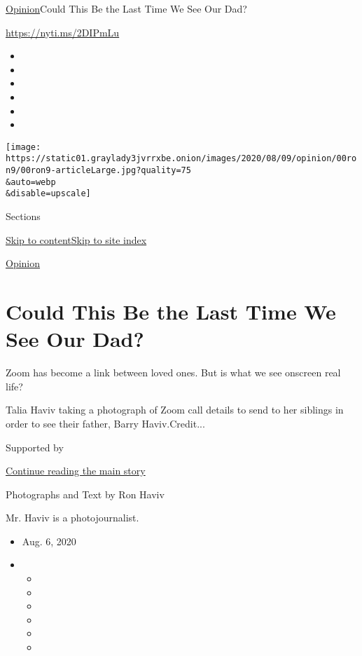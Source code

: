 \href{/section/opinion}{Opinion}\textbar{}Could This Be the Last Time We
See Our Dad?

\url{https://nyti.ms/2DIPmLu}

\begin{itemize}
\item
\item
\item
\item
\item
\item
\end{itemize}

\texttt{[image: https://static01.graylady3jvrrxbe.onion/images/2020/08/09/opinion/00ron9/00ron9-articleLarge.jpg?quality=75\\\&auto=webp\\\&disable=upscale]}

Sections

\protect\hyperlink{site-content}{Skip to
content}\protect\hyperlink{site-index}{Skip to site index}

\href{/section/opinion}{Opinion}

\hypertarget{could-this-be-the-last-time-we-see-our-dad}{%
\section{Could This Be the Last Time We See Our
Dad?}\label{could-this-be-the-last-time-we-see-our-dad}}

Zoom has become a link between loved ones. But is what we see onscreen
real life?

Talia Haviv taking a photograph of Zoom call details to send to her
siblings in order to see their father, Barry Haviv.Credit...

Supported by

\protect\hyperlink{after-sponsor}{Continue reading the main story}

Photographs and Text by Ron Haviv

Mr. Haviv is a photojournalist.

\begin{itemize}
\item
  Aug. 6, 2020
\item
  \begin{itemize}
  \item
  \item
  \item
  \item
  \item
  \item
  \end{itemize}
\end{itemize}

